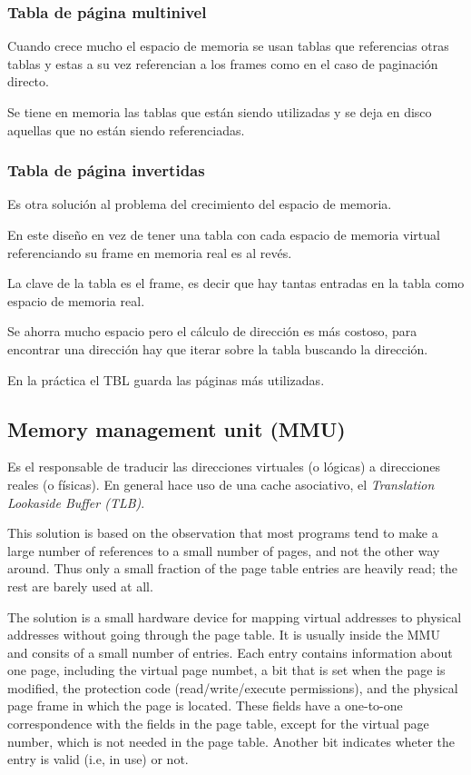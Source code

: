 \documentclass[a4paper, twoside]{article}
\begin{document}
\subsubsection{Tabla de página multinivel}
Cuando crece mucho el espacio de memoria se usan tablas que referencias otras tablas y estas a su vez referencian a los frames como en el caso de paginación directo.

Se tiene en memoria las tablas que están siendo utilizadas y se deja en disco aquellas que no están siendo referenciadas.

\subsubsection{Tabla de página invertidas}
Es otra solución al problema del crecimiento del espacio de memoria.

En este diseño en vez de tener una tabla con cada espacio de memoria virtual referenciando su frame en memoria real es al revés.

La clave de la tabla es el frame, es decir que hay tantas entradas en la tabla como espacio de memoria real.

Se ahorra mucho espacio pero el cálculo de dirección es más costoso, para encontrar una dirección hay que iterar sobre la tabla buscando la dirección.

En la práctica el TBL guarda las páginas más utilizadas.

\subsection{Memory management unit (MMU)}
Es el responsable de traducir las direcciones virtuales (o lógicas) a direcciones reales (o físicas).
En general hace uso de una cache asociativo, el \emph{Translation Lookaside Buffer (TLB)}.

This solution is based on the observation that most programs tend to make a large number of references to a small number of pages, and not the other way around. Thus only a small fraction of the page table entries are heavily read; the rest are barely used at all.

The solution is a small hardware device for mapping virtual addresses to physical addresses without going through the page table. It is usually inside the MMU and consits of a small number of entries. Each entry contains information about one page, including the virtual page numbet, a bit that is set when the page is modified, the protection code (read/write/execute permissions), and the physical page frame in which the page is located. These fields have a one-to-one correspondence with the fields in the page table, except for the virtual page number, which is not needed in the page table. Another bit indicates wheter the entry is valid (i.e, in use) or not.
\end{document}
